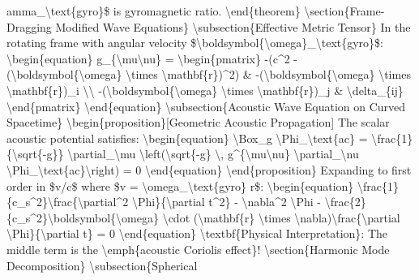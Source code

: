 amma\_\textbackslash{}text\{gyro\}\$ is gyromagnetic ratio. \textbackslash{}end\{theorem\} \textbackslash{}section\{Frame-Dragging Modified Wave Equations\} \textbackslash{}subsection\{Effective Metric Tensor\} In the rotating frame with angular velocity \$\textbackslash{}boldsymbol\{\textbackslash{}omega\}\_\textbackslash{}text\{gyro\}\$: \textbackslash{}begin\{equation\} g\_\{\textbackslash{}mu\textbackslash{}nu\} = \textbackslash{}begin\{pmatrix\} -(c\textasciicircum{}2 - (\textbackslash{}boldsymbol\{\textbackslash{}omega\} \textbackslash{}times \textbackslash{}mathbf\{r\})\textasciicircum{}2) \& -(\textbackslash{}boldsymbol\{\textbackslash{}omega\} \textbackslash{}times \textbackslash{}mathbf\{r\})\_i \textbackslash{}\textbackslash{} -(\textbackslash{}boldsymbol\{\textbackslash{}omega\} \textbackslash{}times \textbackslash{}mathbf\{r\})\_j \& \textbackslash{}delta\_\{ij\} \textbackslash{}end\{pmatrix\} \textbackslash{}end\{equation\} \textbackslash{}subsection\{Acoustic Wave Equation on Curved Spacetime\} \textbackslash{}begin\{proposition\}[Geometric Acoustic Propagation] The scalar acoustic potential satisfies: \textbackslash{}begin\{equation\} \textbackslash{}Box\_g \textbackslash{}Phi\_\textbackslash{}text\{ac\} = \textbackslash{}frac\{1\}\{\textbackslash{}sqrt\{-g\}\} \textbackslash{}partial\_\textbackslash{}mu \textbackslash{}left(\textbackslash{}sqrt\{-g\} \textbackslash{}, g\textasciicircum{}\{\textbackslash{}mu\textbackslash{}nu\} \textbackslash{}partial\_\textbackslash{}nu \textbackslash{}Phi\_\textbackslash{}text\{ac\}\textbackslash{}right) = 0 \textbackslash{}end\{equation\} \textbackslash{}end\{proposition\} Expanding to first order in \$v/c\$ where \$v = \textbackslash{}omega\_\textbackslash{}text\{gyro\} r\$: \textbackslash{}begin\{equation\} \textbackslash{}frac\{1\}\{c\_s\textasciicircum{}2\}\textbackslash{}frac\{\textbackslash{}partial\textasciicircum{}2 \textbackslash{}Phi\}\{\textbackslash{}partial t\textasciicircum{}2\} - \textbackslash{}nabla\textasciicircum{}2 \textbackslash{}Phi - \textbackslash{}frac\{2\}\{c\_s\textasciicircum{}2\}\textbackslash{}boldsymbol\{\textbackslash{}omega\} \textbackslash{}cdot (\textbackslash{}mathbf\{r\} \textbackslash{}times \textbackslash{}nabla)\textbackslash{}frac\{\textbackslash{}partial \textbackslash{}Phi\}\{\textbackslash{}partial t\} = 0 \textbackslash{}end\{equation\} \textbackslash{}textbf\{Physical Interpretation\}: The middle term is the \textbackslash{}emph\{acoustic Coriolis effect\}! \textbackslash{}section\{Harmonic Mode Decomposition\} \textbackslash{}subsection\{Spherical

